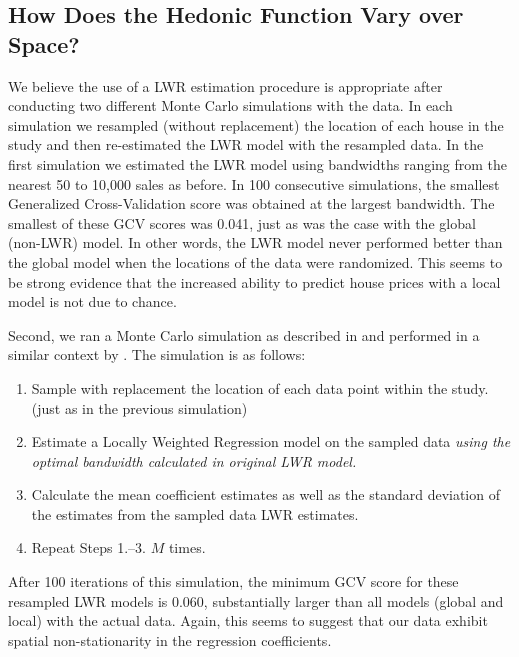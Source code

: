 \documentclass{article}\usepackage{graphicx, color}
\begin{document}
\subsection{How Does the Hedonic Function Vary over Space?}
We believe the use of a LWR estimation procedure is appropriate after conducting two different Monte Carlo simulations with the data. In each simulation we resampled (without replacement) the location of each house in the study and then re-estimated the LWR model with the resampled data. In the first simulation we estimated the LWR model using bandwidths ranging from the nearest 50 to 10,000 sales as before. In 100 consecutive simulations, the smallest Generalized Cross-Validation score was obtained at the largest bandwidth. The smallest of these GCV scores was 0.041, just as was the case with the global (non-LWR) model. In other words, the LWR model never performed better than the global model when the locations of the data were randomized. This seems to be strong evidence that the increased ability to predict house prices with a local model is not due to chance. 

Second, we ran a Monte Carlo simulation as described in \citet{Fotheringham2002} and performed in a similar context by \citet{MarmolejoDuarteCarlos;GonzalezTamez2009}. The simulation is as follows:
\begin{enumerate}
\item Sample with replacement the location of each data point within the study. (just as in the previous simulation)
\item Estimate a Locally Weighted Regression model on the sampled data \emph{using the optimal bandwidth calculated in original LWR model.}
\item Calculate the mean coefficient estimates as well as the standard deviation of the estimates from the sampled data LWR estimates.
\item Repeat Steps 1.--3. $M$ times.
\end{enumerate}
After 100 iterations of this simulation, the minimum GCV score for these resampled LWR models is 0.060, substantially larger than all models (global and local) with the actual data. Again, this seems to suggest that our data exhibit spatial non-stationarity in the regression coefficients.
\end{document}
